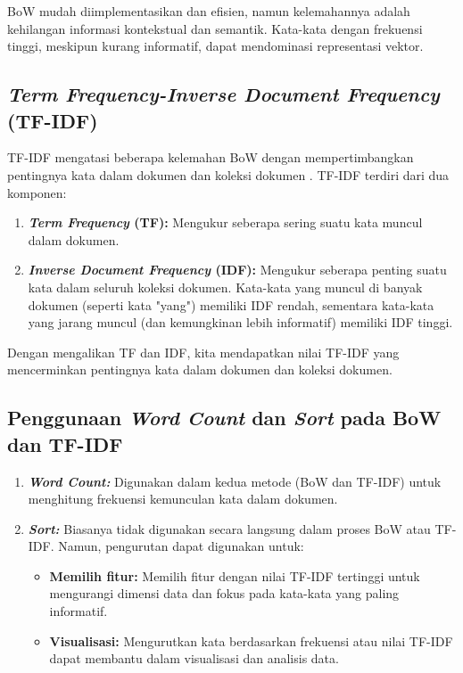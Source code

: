 BoW mudah diimplementasikan dan efisien, namun kelemahannya adalah kehilangan informasi kontekstual dan semantik. Kata-kata dengan frekuensi tinggi, meskipun kurang informatif, dapat mendominasi representasi vektor.

\subsection{\textit{Term Frequency-Inverse Document Frequency} (TF-IDF)}

TF-IDF mengatasi beberapa kelemahan BoW dengan mempertimbangkan pentingnya kata dalam dokumen dan koleksi dokumen \cite{qaiserTextMiningUse2018}. TF-IDF terdiri dari dua komponen:

\begin{enumerate}
    \item \textbf{\textit{Term Frequency} (TF): } Mengukur seberapa sering suatu kata muncul dalam dokumen.
    \item \textbf{\textit{Inverse Document Frequency} (IDF): } Mengukur seberapa penting suatu kata dalam seluruh koleksi dokumen. Kata-kata yang muncul di banyak dokumen (seperti kata "yang") memiliki IDF rendah, sementara kata-kata yang jarang muncul (dan kemungkinan lebih informatif) memiliki IDF tinggi.
\end{enumerate}

Dengan mengalikan TF dan IDF, kita mendapatkan nilai TF-IDF yang mencerminkan pentingnya kata dalam dokumen dan koleksi dokumen. 

\subsection{Penggunaan \textit{Word Count} dan \textit{Sort} pada BoW dan TF-IDF}

\begin{enumerate}
    \item \textbf{\textit{Word Count:}} Digunakan dalam kedua metode (BoW dan TF-IDF) untuk menghitung frekuensi kemunculan kata dalam dokumen.
    \item \textbf{\textit{Sort:}} Biasanya tidak digunakan secara langsung dalam proses BoW atau TF-IDF. Namun, pengurutan dapat digunakan untuk:
    \begin{itemize}
        \item \textbf{Memilih fitur:} Memilih fitur dengan nilai TF-IDF tertinggi untuk mengurangi dimensi data dan fokus pada kata-kata yang paling informatif. 
        \item \textbf{Visualisasi:} Mengurutkan kata berdasarkan frekuensi atau nilai TF-IDF dapat membantu dalam visualisasi dan analisis data.
    \end{itemize}
\end{enumerate}


